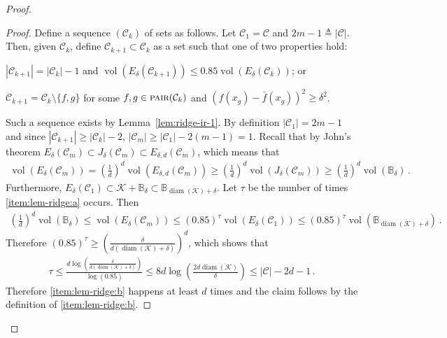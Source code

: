 \documentclass[letter, 12pt]{report}
\newcommand{\pair}{\operatorname{\textsc{pair}}}
\newcommand{\ball}{\mathbb{B}}
\newcommand{\cK}{\mathcal K}
\newcommand{\cC}{\mathcal C}
\newcommand{\vol}{\operatorname{vol}}
\newcommand{\diam}{\operatorname{diam}}
\newcommand{\1}{\mathbf{1}}
\theoremstyle{plain}
\theoremstyle{definition}
\theoremstyle{remark}
\begin{document}
\begin{proof}
    \begin{proof}
        Define a sequence $(\cC_k)$ of sets as follows.
        Let $\cC_1 = \cC$ and $2m-1 \triangleq |\cC|$. Then, given $\cC_k$, define $\cC_{k+1} \subset \cC_k$ as a set such that one of two properties hold:
        \begin{enumroman}
            \item $|\cC_{k+1}| = |\cC_k| - 1$ and $\vol(E_\delta(\cC_{k+1})) \leq 0.85 \vol(E_\delta(\cC_k))$; or \label{item:lem-ridge:a}
            \item $\cC_{k+1} = \cC_k \setminus \{f, g\}$ for some $f, g \in \pair(\cC_k)$ and $(f(x_g) - \bar f(x_g))^2 \geq \delta^2$. \label{item:lem-ridge:b}
        \end{enumroman}
        Such a sequence exists by Lemma~\ref{lem:ridge-ir-1}.
        By definition $|\cC_1| = 2m-1$ and since $|\cC_{k+1}| \geq |\cC_k| - 2$, $|\cC_m| \geq |\cC_1| - 2(m-1) = 1$.
        Recall that by John's theorem $E_\delta(\cC_m) \subset J_\delta(\cC_m) \subset E_{\delta,d}(\cC_m)$, which means that
        \begin{align*}
            \vol(E_\delta(\cC_m))
            = \left(\frac{1}{d}\right)^d \vol(E_{\delta,d}(\cC_m))
            \geq \left(\frac{1}{d}\right)^d \vol(J_\delta(\cC_m))
            \geq \left(\frac{1}{d}\right)^d \vol(\ball_\delta) \,.
        \end{align*}
        Furthermore, $E_\delta(\cC_1) \subset \cK + \ball_\delta \subset \ball_{\diam(\cK) + \delta}$.
        Let $\tau$ be the number of times \ref{item:lem-ridge:a} occurs. Then
        \begin{align*}
            \left(\frac{1}{d}\right)^d \vol(\ball_\delta) \leq \vol(E_\delta(\cC_m)) \leq (0.85)^\tau \vol(E_\delta(\cC_1)) \leq (0.85)^\tau \vol(\ball_{\diam(\cK)+\delta})\,.
        \end{align*}
        Therefore $(0.85)^\tau \geq \left(\frac{\delta}{d(\diam(\cK) + \delta)}\right)^d$,
        which shows that
        \begin{align*}
            \tau
            \leq \frac{d \log\left(\frac{\delta}{d(\diam(\cK) + \delta)}\right)}{\log(0.85)}
            \leq 8 d \log\left(\frac{2d \diam(\cK)}{\delta}\right)
            \leq |\cC| - 2d - 1\,.
        \end{align*}
        Therefore \ref{item:lem-ridge:b} happens at least $d$ times and the claim follows by the definition of \ref{item:lem-ridge:b}.
    \end{proof}


\end{proof}
\end{document}
